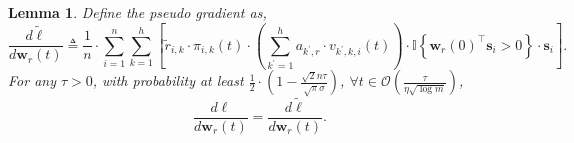 \documentclass[10pt]{article}
\def\rvs{{\mathbf{s}}}
\def\rvw{{\mathbf{w}}}
\newtheorem{lem}{Lemma}
\def\sI{{\mathbb{I}}}
\begin{document}
\begin{lem}
\label{lem:gradient_upper_bound}
	Define the pseudo gradient as,
\begin{equation*}
	\frac{d \tilde{\ell}}{d \rvw_r(t)} \triangleq \frac{1}{n} \cdot \sum\limits_{i=1}^{n}{ \sum\limits_{k=1}^{h}{ \left[ \tilde{r}_{i,k} \cdot \pi_{i,k}(t) \cdot \left( \sum\limits_{k^\prime = 1}^{h}{ a_{k^\prime,r}  \cdot v_{k^\prime,k,i}(t) } \right) \cdot \sI\left\{ \rvw_r(0)^\top \rvs_i > 0 \right\} \cdot \rvs_i \right] } }.
\end{equation*}
	For any $\tau > 0$, with probability at least $\frac{1}{2} \cdot \left( 1 - \frac{\sqrt{2}n\tau}{\sqrt{\pi}\sigma} \right)$, $\forall t \in \mathcal{O}\left(\frac{\tau}{\eta  \sqrt{\log{m}}}\right)$,
\begin{equation}
	\frac{d\ell}{d \rvw_r(t)} = \frac{d \tilde{\ell}}{d \rvw_r(t)}.
\end{equation}
\end{lem}
\end{document}
